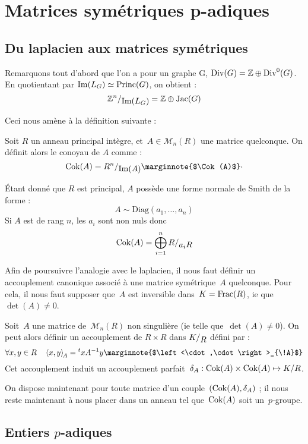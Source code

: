 \section{Matrices symétriques p-adiques}
\subsection{Du laplacien aux matrices symétriques}

Remarquons tout d'abord que l'on a pour un graphe G, $\operatorname{Div}(G) = \mathbb{Z} \oplus \operatorname{Div}^0(G)$.\\[0.2cm]
En quotientant par $\operatorname{Im}(L_G) \simeq \operatorname{Princ}(G)$, on obtient : 
\[ \quotient{\mathbb{Z}^n}{\Im(L_G)} = \mathbb{Z} \oplus \Jac(G) \]

Ceci nous amène à la définition suivante : 
\begin{defi}
Soit $R$ un anneau principal intègre, et~$A\in\mathcal{M}_n(R)$ une matrice quelconque.
On définit alors le conoyau de $A$ comme : 
\[\Cok(A) = \quotient{R^n}{\Im(A)} \text{\marginnote{$\Cok(A)$}}\cdot\]
\end{defi}

\begin{rem}
\'Etant donné que $R$ est principal, $A$ possède une forme normale de Smith de la forme :
\[ A \sim \text{Diag}(a_1,\dots,a_n) \]
Si $A$ est de rang $n$, les $a_i$ sont non nuls donc 
\[\Cok(A) = \bigoplus_{i=1}^n{\quotient{R}{a_iR}}\]
\end{rem}

Afin de poursuivre l'analogie avec le laplacien, il nous faut définir un accouplement canonique associé à une matrice symétrique~$A$ quelconque. Pour cela, il nous faut supposer que~$A$ est inversible dans~$K = \operatorname{Frac}(R)$, ie que~$\det(A)\neq0$.
\begin{defi}
Soit~$A$ une matrice de~$\mathcal{M}_n(R)$ non singulière (ie telle que~$\det(A)\neq 0$).
On peut alors définir un accouplement de $R\times R$ dans $\quotient{K}{R}$ défini par :
\[ \forall x,y\in R\quad \left<x,y\right>_{\!A} = {}^txA^{-1}y \text{\marginnote{$\left<\cdot,\cdot\right>_{\!A}$}}\]
Cet accouplement induit un accouplement parfait~$\delta_A : \operatorname{Cok}(A)\times\operatorname{Cok}(A) \mapsto K/R$.
\end{defi}

On dispose maintenant pour toute matrice d'un couple~$(\operatorname{Cok}(A), \delta_A)$ ; il nous reste maintenant à nous placer dans un anneau tel que~$\operatorname{Cok}(A)$ soit un~$p$-groupe.

\subsection{Entiers $p$-adiques}

